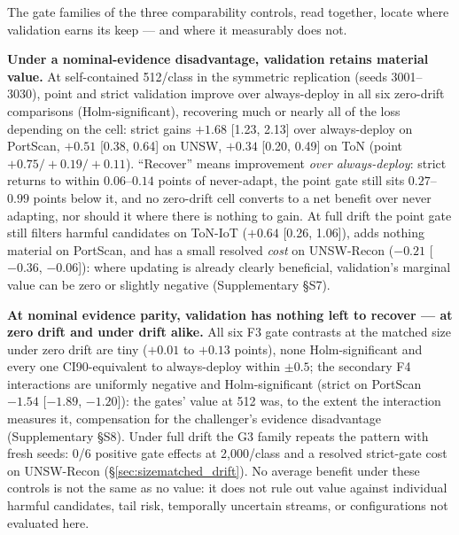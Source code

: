 \documentclass[journal]{IEEEtran}
\begin{document}
The gate families of the three comparability controls, read together, locate where validation earns its keep --- and where it measurably does not.

\textbf{Under a nominal-evidence disadvantage, validation retains material value.} At self-contained 512/class in the symmetric replication (seeds 3001--3030), point and strict validation improve over always-deploy in all six zero-drift comparisons (Holm-significant), recovering much or nearly all of the loss depending on the cell: strict gains $+1.68$ [1.23, 2.13] over always-deploy on PortScan, $+0.51$ [0.38, 0.64] on UNSW, $+0.34$ [0.20, 0.49] on ToN (point $+0.75/+0.19/+0.11$). ``Recover'' means improvement \emph{over always-deploy}: strict returns to within $0.06$--$0.14$ points of never-adapt, the point gate still sits $0.27$--$0.99$ points below it, and no zero-drift cell converts to a net benefit over never adapting, nor should it where there is nothing to gain. At full drift the point gate still filters harmful candidates on ToN-IoT ($+0.64$ [0.26, 1.06]), adds nothing material on PortScan, and has a small resolved \emph{cost} on UNSW-Recon ($-0.21$ [$-0.36$, $-0.06$]): where updating is already clearly beneficial, validation's marginal value can be zero or slightly negative (Supplementary \S S7).

\textbf{At nominal evidence parity, validation has nothing left to recover --- at zero drift and under drift alike.} All six F3 gate contrasts at the matched size under zero drift are tiny ($+0.01$ to $+0.13$ points), none Holm-significant and every one CI90-equivalent to always-deploy within $\pm0.5$; the secondary F4 interactions are uniformly negative and Holm-significant (strict on PortScan $-1.54$ [$-1.89$, $-1.20$]): the gates' value at 512 was, to the extent the interaction measures it, compensation for the challenger's evidence disadvantage (Supplementary \S S8). Under full drift the G3 family repeats the pattern with fresh seeds: 0/6 positive gate effects at 2{,}000/class and a resolved strict-gate cost on UNSW-Recon (\S\ref{sec:sizematched_drift}). No average benefit under these controls is not the same as no value: it does not rule out value against individual harmful candidates, tail risk, temporally uncertain streams, or configurations not evaluated here.
\end{document}
